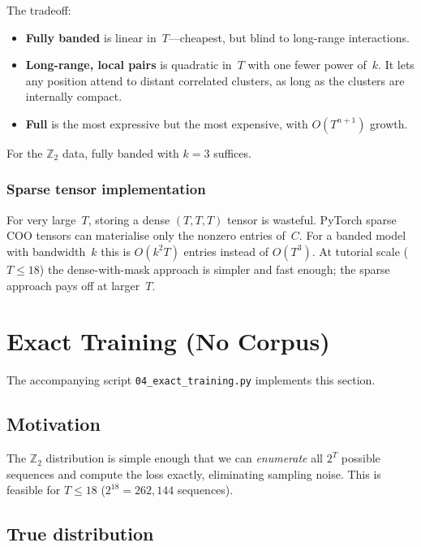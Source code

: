 \documentclass[11pt]{article}
\begin{document}
The tradeoff:
\begin{itemize}
  \item \textbf{Fully banded} is linear in~$T$---cheapest, but blind to
        long-range interactions.
  \item \textbf{Long-range, local pairs} is quadratic in~$T$ with one
        fewer power of~$k$.  It lets any position attend to distant
        correlated clusters, as long as the clusters are internally
        compact.
  \item \textbf{Full} is the most expressive but the most expensive,
        with $O(T^{n+1})$ growth.
\end{itemize}

For the $\mathbb{Z}_2$ data, fully banded with $k = 3$ suffices.

\subsubsection{Sparse tensor implementation}

For very large~$T$, storing a dense $(T, T, T)$ tensor is wasteful.
PyTorch sparse COO tensors can materialise only the nonzero entries
of~$C$.  For a banded model with bandwidth~$k$ this is $O(k^2 T)$
entries instead of $O(T^3)$.  At tutorial scale ($T \leq 18$) the
dense-with-mask approach is simpler and fast enough; the sparse approach
pays off at larger~$T$.

\section{Exact Training (No Corpus)}\label{sec:exact}

The accompanying script \texttt{04\_exact\_training.py} implements this
section.

\subsection{Motivation}

The $\mathbb{Z}_2$ distribution is simple enough that we can
\emph{enumerate} all $2^T$ possible sequences and compute the loss
exactly, eliminating sampling noise.  This is feasible for $T \leq 18$
($2^{18} = 262{,}144$ sequences).

\subsection{True distribution}
\end{document}
